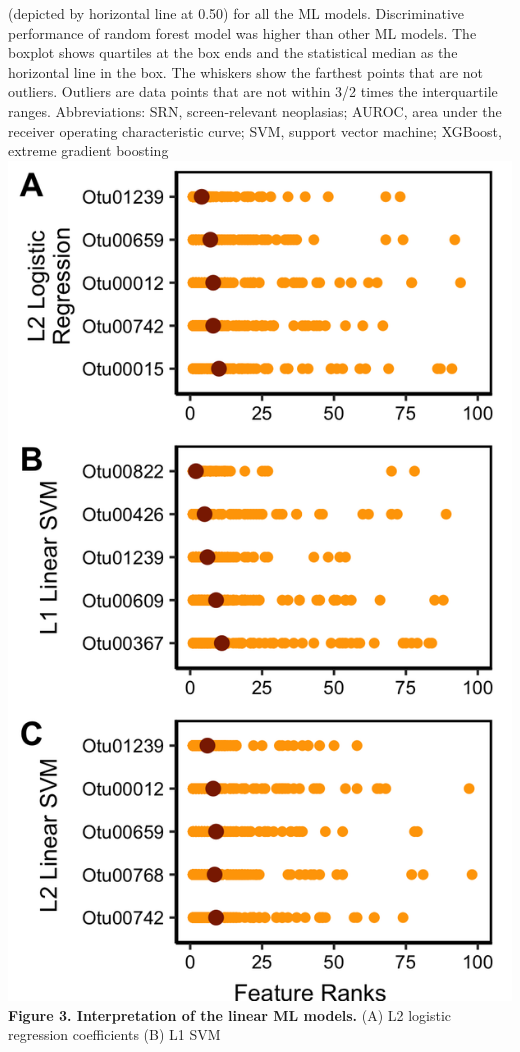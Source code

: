 \documentclass[11pt,]{article}
\begin{document}
(depicted by horizontal line at 0.50) for all the ML models.
Discriminative performance of random forest model was higher than other
ML models. The boxplot shows quartiles at the box ends and the
statistical median as the horizontal line in the box. The whiskers show
the farthest points that are not outliers. Outliers are data points that
are not within 3/2 times the interquartile ranges. Abbreviations: SRN,
screen-relevant neoplasias; AUROC, area under the receiver operating
characteristic curve; SVM, support vector machine; XGBoost, extreme
gradient boosting \newpage
\includegraphics{Figure_3.png} \textbf{Figure 3. Interpretation of the
linear ML models.} (A) L2 logistic regression coefficients (B) L1 SVM
\end{document}
